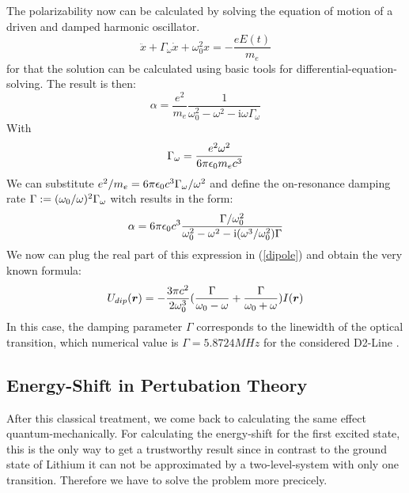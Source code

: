 The polarizability now can be calculated by solving the equation of motion of a driven and damped harmonic oscillator.
\begin{equation}
\ddot x+\Gamma_\omega\dot x+\omega^2_0x=-\frac{eE(t)}{m_e}
\end{equation} 
for that the solution can be calculated using basic tools for differential-equation-solving. The result is then:
\begin{equation}
\alpha=\frac{e^2}{m_e}\frac{1}{\omega^2_0-\omega^2-\mathrm{i}\omega\Gamma_\omega}
\end{equation} 
With
\begin{equation}
\Gamma_\omega=\frac{e^2\omega^2}{6\pi\epsilon_0m_ec^3}
\end{equation}
We can substitute $e^2/m_e=6\pi\epsilon_0c^3\Gamma_\omega/\omega^2$ and define the on-resonance damping rate $\Gamma:=(\omega_0/\omega)^2\Gamma_\omega$ witch results in the form:
\begin{equation}
\alpha=6\pi\epsilon_0c^3\frac{\Gamma/\omega^2_0}{\omega^2_0-\omega^2-\mathrm{i}(\omega^3/\omega^2_0)\Gamma}
\end{equation} 
We now can plug the real part of this expression in (\ref{dipole}) and obtain the very known formula:
\begin{equation}
U_{dip}(\boldsymbol{r})=-\frac{3\pi c^2}{2\omega^3_0}(\frac{\Gamma}{\omega_0-\omega}+\frac{\Gamma}{\omega_0+\omega})I(\boldsymbol{r})
\label{classic}\end{equation}
In this case, the damping parameter $\Gamma$ corresponds to the linewidth of the optical transition, which numerical value is $\Gamma=5.8724 \unit{MHz}$ for the considered D2-Line \cite{gehm}.

\subsection{Energy-Shift in Pertubation Theory}

After this classical treatment, we come back to calculating the same effect quantum-mechanically. For calculating the energy-shift for the first excited state, this is the only way to get a trustworthy result since in contrast to the ground state of Lithium it can not be approximated by a two-level-system with only one transition. Therefore we have to solve the problem more precicely. 

